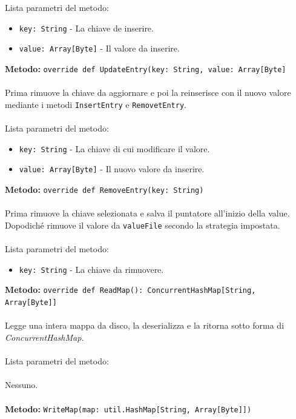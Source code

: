 \documentclass[a4paper]{article}
\begin{document}
		\\ \\
		Lista parametri del metodo:
		\begin{itemize}
			\item \texttt{key: String} - La chiave de inserire.
			\item \texttt{value: Array[Byte]} - Il valore da inserire.
		\end{itemize}
		\textbf{Metodo:} \texttt{override def UpdateEntry(key: String, value: Array[Byte]}
		\\ \\
		Prima rimuove la chiave da aggiornare e poi la reinserisce con il nuovo valore mediante i metodi \texttt{InsertEntry} e \texttt{RemovetEntry}.
		\\ \\
		Lista parametri del metodo:
		\begin{itemize}
			\item \texttt{key: String} - La chiave di cui modificare il valore.
			\item \texttt{value: Array[Byte]} - Il nuovo valore da inserire. 
		\end{itemize}
		\textbf{Metodo:} \texttt{override def RemoveEntry(key: String)}
		\\ \\
		Prima rimuove la chiave selezionata e salva il puntatore all'inizio della value. Dopodiché rimuove il valore da \texttt{valueFile} secondo la strategia impostata.
		\\ \\
		Lista parametri del metodo:
		\begin{itemize}
			\item \texttt{key: String} - La chiave da rimuovere.
		\end{itemize}
		\textbf{Metodo:} \texttt{override def ReadMap(): ConcurrentHashMap[String, Array[Byte]]}
		\\ \\
		Legge una intera mappa da disco, la deserializza e la ritorna sotto forma di \emph{ConcurrentHashMap}.
		\\ \\
		Lista parametri del metodo:
		\\ \\
		Nessuno.
		\\ \\
		\textbf{Metodo:} \texttt{WriteMap(map: util.HashMap[String, Array[Byte]])}
		\\ \\
\end{document}
